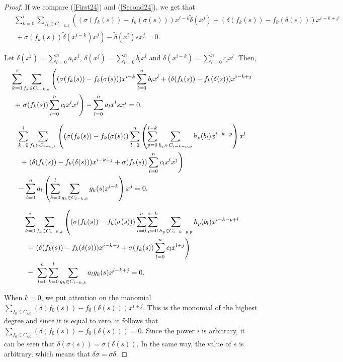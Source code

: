 \documentclass[10pt,a4paper]{amsart}
\begin{document}
\begin{proof}
If we compare (\ref{First24}) and (\ref{Second24}), we get that
\begin{align*}
&\ \sum_{k=0}^{i}\sum_{f_k\in C_{i-k,k}}\left((\sigma(f_k(s))-f_k(\sigma(s))) x^{i-k}\widetilde{\delta}(x^j) + (\delta(f_k(s))-f_k(\delta(s))) x^{i-k+j} \right. \\
&\ \ + \left. \sigma(f_k(s))\widetilde{\delta}(x^{i-k}) x^j\right) - \widetilde{\delta}(x^i)s x^j=0.
\end{align*}

Let $\widetilde{\delta}(x^i) = \sum\limits_{l=0}^{n} a_lx^l$, $\widetilde{\delta}(x^j) = \sum\limits_{l=0}^{n}b_l x^l$ and $\widetilde{\delta}(x^{i-k}) = \sum\limits_{l=0}^{n}c_l x^l$. Then,
\begin{align*}
&\ \notag \sum_{k=0}^{i}\sum_{f_k\in C_{i-k,k}}\left((\sigma(f_k(s))-f_k(\sigma(s))) x^{i-k}\sum_{l=0}^{n}b_l x^l+(\delta(f_k(s))-f_k(\delta(s))) x^{i-k+j} \right. \\ \notag
&\ \ \left. + \ \sigma(f_k(s))\sum_{l=0}^{n}c_l x^l x^j\right) - \sum_{l=0}^{n}a_l x^ls x^j=0. \notag
\end{align*}

\begin{align*}
&\ \sum_{k=0}^{i}\sum_{f_k\in C_{i-k,k}}\left((\sigma(f_k(s))-f_k(\sigma(s)))\sum_{l=0}^{n}\left(\sum_{p=0}^{i-k}\sum_{h_p\in C_{i-k-p,p}}h_p(b_l) x^{i-k-p}\right) x^l \right. \\ \notag
&\ \ \left. + \ (\delta(f_k(s))-f_k(\delta(s))) x^{i-k+j} +\sigma(f_k(s))\sum_{l=0}^{n}c_l x^l x^j\right)\\ \notag
&\ -\sum_{l=0}^{n}a_l\left(\sum_{k=0}^l\sum_{g_k\in C_{l-k,k}}g_k(s) x^{l-k}\right) x^j = 0. 
\end{align*}

\begin{align}\label{Eq1}
&\ \sum_{k=0}^{i}\sum_{f_k\in C_{i-k,k}}\left((\sigma(f_k(s))-f_k(\sigma(s)))\sum_{l=0}^{n}\sum_{p=0}^{i-k}\sum_{h_p\in C_{i-k-p,p}}h_p(b_l)x^{i-k-p+l} \right. \\ \notag
&\ \ \left. + \ (\delta(f_k(s))-f_k(\delta(s)))x^{i-k+j} +\sigma(f_k(s))\sum_{l=0}^{n}c_l x^{l+j}\right)\\ \notag
&\ \ - \ \sum_{l=0}^{n}\sum_{k=0}^l\sum_{g_k\in C_{l-k,k}}a_lg_k(s)x^{l-k+j} = 0. 
\end{align}

When $k=0$, we put attention on the monomial $\sum_{f_0\in C_{i,0}}(\delta(f_0(s))-f_0(\delta(s)))x^{i+j}$. This is the monomial of the highest degree and since it is equal to zero, it follows that $\sum_{f_0\in C_{i,0}} \left(\delta(f_0(s))-f_0(\delta(s))\right) = 0$. Since the power $i$ is arbitrary, it can be seen that $\delta(\sigma(s))=\sigma(\delta(s))$. In the same way, the value of $s$ is arbitrary, which means that $\delta\sigma = \sigma\delta$.


\end{proof}
\end{document}
